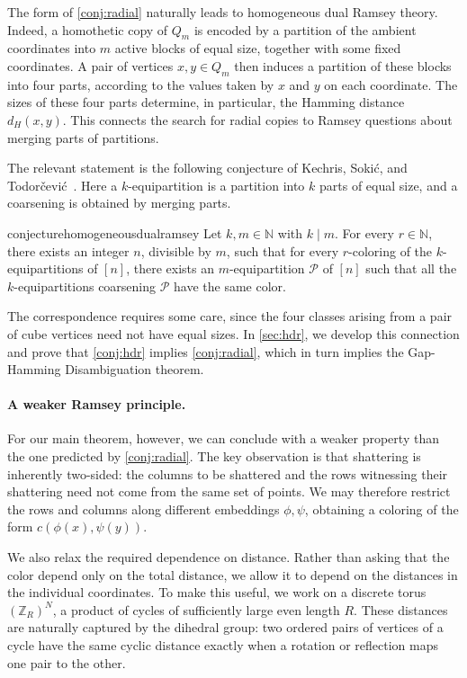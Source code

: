 \documentclass[11pt]{article}
\theoremstyle{remark}
\begin{document}
The form of \cref{conj:radial} naturally leads to homogeneous dual Ramsey theory.
Indeed, a homothetic copy of $Q_m$ is encoded by a partition of the ambient coordinates into $m$ active blocks of equal size, together with some fixed coordinates. 
A pair of vertices $x,y\in Q_m$ then induces a partition of these blocks into four parts, according to the values taken by $x$ and $y$ on each coordinate.
The sizes of these four parts determine, in particular, the Hamming distance $d_H(x,y)$.
This connects the search for radial copies to Ramsey questions about merging parts of partitions.

The relevant statement is the following conjecture of Kechris, Soki{\'c}, and Todor{\v{c}}evi{\'c}~\cite{KST17}.
Here a $k$-equipartition is a partition into $k$ parts of equal size, and a coarsening is obtained by merging parts.

\begin{restatable}{conjecture}{homogeneousdualramsey}\label{conj:hdr}
Let $k,m\in\mathbb N$ with $k\mid m$. 
For every $r \in\mathbb N$, there exists an integer $n$, divisible by $m$, such that for every $r$-coloring of the $k$-equipartitions of $[n]$, there exists an $m$-equipartition $\mathcal{P}$ of $[n]$ such that all the $k$-equipartitions coarsening $\mathcal{P}$ have the same color.
\end{restatable}

The correspondence requires some care, since the four classes arising from a pair of cube vertices need not have equal sizes.
In \cref{sec:hdr}, we develop this connection and prove that \cref{conj:hdr} implies \cref{conj:radial}, which in turn implies the Gap-Hamming Disambiguation theorem.

\paragraph{A weaker Ramsey principle.}

For our main theorem, however, we can conclude with a weaker property than the one predicted by \cref{conj:radial}.
The key observation is that shattering is inherently two-sided: the columns to be shattered and the rows witnessing their shattering need not come from the same set of points.
We may therefore restrict the rows and columns along different embeddings $\phi,\psi$, obtaining a coloring of the form $c(\phi(x),\psi(y))$.

We also relax the required dependence on distance.
Rather than asking that the color depend only on the total distance, we allow it to depend on the distances in the individual coordinates.
To make this useful, we work on a discrete torus $(\mathbb Z_R)^N$, a product of cycles of sufficiently large even length $R$.
These distances are naturally captured by the dihedral group: two ordered pairs of vertices of a cycle have the same cyclic distance exactly when a rotation or reflection maps one pair to the other.
\end{document}
